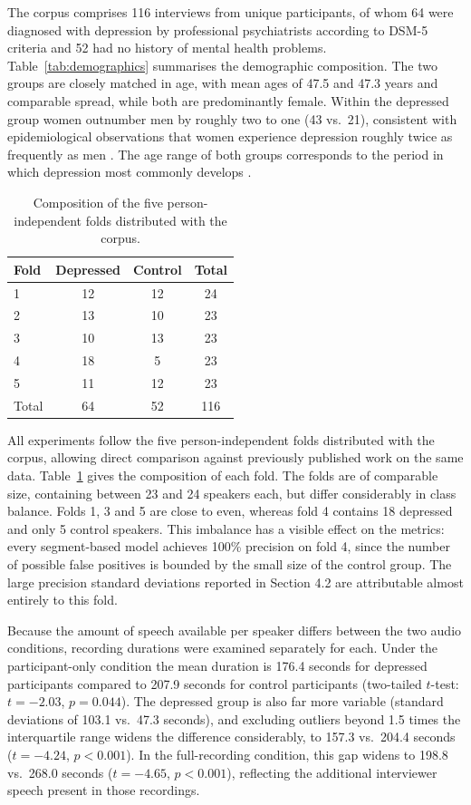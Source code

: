 \documentclass{mproj}
\begin{document}
The corpus comprises 116 interviews from unique participants, of whom 64 were diagnosed with depression by professional psychiatrists according to DSM-5 criteria \cite{dsm5} and 52 had no history of mental health problems. Table~\ref{tab:demographics} summarises the demographic composition. The two groups are closely matched in age, with mean ages of 47.5 and 47.3 years and comparable spread, while both are predominantly female. Within the depressed group women outnumber men by roughly two to one (43 vs.\ 21), consistent with epidemiological observations that women experience depression roughly twice as frequently as men \cite{kessler2003}. The age range of both groups corresponds to the period in which depression most commonly develops \cite{garber2009}.

\begin{table}[htbp]
  \centering
  \caption{Composition of the five person-independent folds distributed with
  the corpus.}
  \label{tab:folds}
  \begin{tabular}{lccc}
    \toprule
    Fold & Depressed & Control & Total \\
    \midrule
    1 & 12 & 12 & 24 \\
    2 & 13 & 10 & 23 \\
    3 & 10 & 13 & 23 \\
    4 & 18 &  5 & 23 \\
    5 & 11 & 12 & 23 \\
    \midrule
    Total & 64 & 52 & 116 \\
    \bottomrule
  \end{tabular}
\end{table}

All experiments follow the five person-independent folds distributed with the corpus, allowing direct comparison against previously published work on the same data. Table~\ref{tab:folds} gives the composition of each fold. The folds are of comparable size, containing between 23 and 24 speakers each, but differ considerably in class balance. Folds 1, 3 and 5 are close to even, whereas fold 4 contains 18 depressed and only 5 control speakers. This imbalance has a visible effect on the metrics: every segment-based model achieves 100\% precision on fold 4, since the number of possible false positives is bounded by the small size of the control group. The large precision standard deviations reported in Section 4.2 are attributable almost entirely to this fold.

Because the amount of speech available per speaker differs between the two audio conditions, recording durations were examined separately for each. Under the participant-only condition the mean duration is 176.4 seconds for depressed participants compared to 207.9 seconds for control participants (two-tailed $t$-test: $t = -2.03$, $p = 0.044$). The depressed group is also far more variable (standard deviations of 103.1 vs.\ 47.3 seconds), and excluding outliers beyond 1.5 times the interquartile range widens the difference considerably, to 157.3 vs.\ 204.4 seconds ($t = -4.24$, $p < 0.001$). In the full-recording condition, this gap widens to 198.8 vs.\ 268.0 seconds ($t = -4.65$, $p < 0.001$), reflecting the additional interviewer speech present in those recordings.
\end{document}
